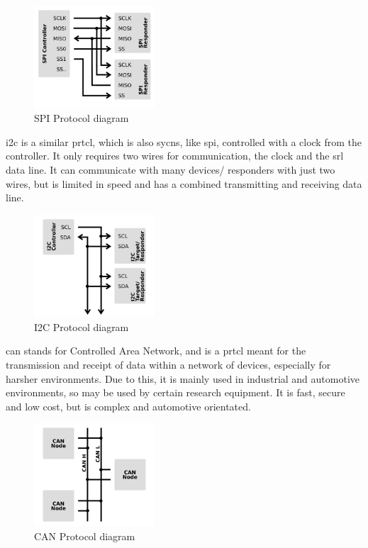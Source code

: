 \documentclass[a4paper,11pt]{report}
\begin{document}
\begin{figure}[H]
\centering
\includegraphics[width=0.4\textwidth]{SPI}
\caption{SPI Protocol diagram}
\end{figure}

\gls{i2c} is a similar \gls{prtcl}, which is also \gls{sycns}, like \gls{spi}, controlled with a clock from the controller. It only requires two wires for communication, the clock and the \gls{srl} data line. It can communicate with many devices/ responders with just two wires, but is limited in speed and has a combined transmitting and receiving data line.

\begin{figure}[H]
\centering
\includegraphics[width=0.4\textwidth]{I2C}
\caption{I2C Protocol diagram}
\end{figure}

\gls{can} stands for Controlled Area Network, and is a \gls{prtcl} meant for the transmission and receipt of data within a network of devices, especially for harsher environments. Due to this, it is mainly used in industrial and automotive environments, so may be used by certain research equipment. It is fast, secure and low cost, but is complex and automotive orientated.

\begin{figure}[H]
\centering
\includegraphics[width=0.4\textwidth]{CAN}
\caption{CAN Protocol diagram}
\end{figure}
\end{document}
